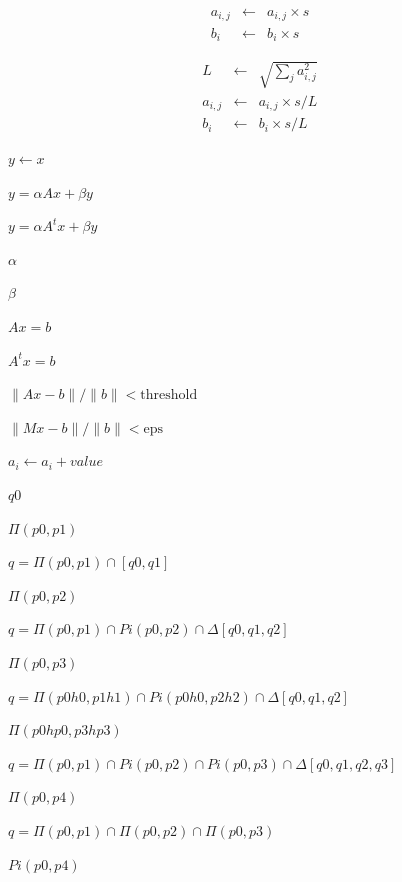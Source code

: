 \documentclass{article}
\begin{document}
\[ \begin{array}{lcl} a_{i,j} & \leftarrow & a_{i,j} \times s \\ b_i & \leftarrow & b_i \times s \end{array} \]
\pagebreak

\[ \begin{array}{lcl} L & \leftarrow & \sqrt{\sum_{j} a_{i,j}^2} \\ a_{i,j} & \leftarrow & a_{i,j} \times s / L\\ b_i & \leftarrow & b_i \times s / L \end{array} \]
\pagebreak

$ y \leftarrow x $
\pagebreak

$ y = \alpha A x + \beta y $
\pagebreak

$ y = \alpha A^t x + \beta y $
\pagebreak

$ \alpha $
\pagebreak

$ \beta $
\pagebreak

$ A x = b $
\pagebreak

$ A^t x = b $
\pagebreak

$ \| A x - b \| / \| b \| < \mbox{threshold} $
\pagebreak

$ \| Mx - b \| / \| b \| < \mbox{eps}$
\pagebreak

$ a_i \leftarrow a_i + value $
\pagebreak

$ q0 $
\pagebreak

$ \Pi(p0,p1) $
\pagebreak

$ q = \Pi(p0,p1) \cap [q0,q1] $
\pagebreak

$ \Pi(p0,p2) $
\pagebreak

$ q = \Pi(p0,p1) \cap Pi(p0,p2) \cap \Delta[q0,q1,q2] $
\pagebreak

$ \Pi(p0,p3) $
\pagebreak

$ q = \Pi(p0 h0,p1 h1) \cap Pi(p0 h0,p2 h2) \cap \Delta[q0, q1, q2] $
\pagebreak

$ \Pi(p0 hp0,p3 hp3) $
\pagebreak

$ q = \Pi(p0,p1) \cap Pi(p0,p2) \cap Pi(p0,p3) \cap \Delta[q0,q1,q2,q3] $
\pagebreak

$ \Pi(p0,p4) $
\pagebreak

$ q = \Pi(p0,p1) \cap \Pi(p0,p2) \cap \Pi(p0,p3) $
\pagebreak

$ Pi(p0,p4) $
\pagebreak
\end{document}
